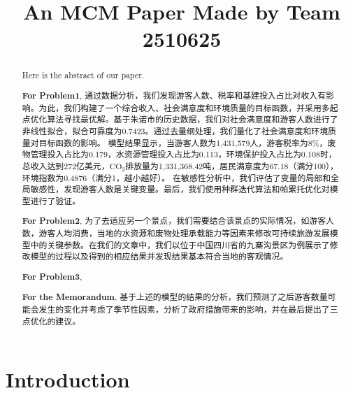 \documentclass[12pt]{article}  %
\title{An MCM Paper Made by Team 2510625}  %
\begin{document}
\begin{abstract}
    Here is the abstract of our paper.

    \textbf{For Problem1}, 通过数据分析，我们发现游客人数、税率和基建投入占比对收入有影响。为此，我们构建了一个综合收入、社会满意度和环境质量的目标函数，并采用多起点优化算法寻找最优解。基于朱诺市的历史数据，我们对社会满意度和游客人数进行了非线性拟合，拟合可靠度为0.7423。通过去量纲处理，我们量化了社会满意度和环境质量对目标函数的影响。
	模型结果显示，当游客人数为1,431,579人，游客税率为8\%，废物管理投入占比为0.179，水资源管理投入占比为0.113，环境保护投入占比为0.108时，总收入达到272亿美元，$\text{CO}_2$排放量为1,331,368.42吨，居民满意度为67.18（满分100），环境指数为0.4876（满分1，越小越好）。
	在敏感性分析中，我们评估了变量的局部和全局敏感性，发现游客人数是关键变量。最后，我们使用种群迭代算法和帕累托优化对模型进行了验证。

    \textbf{For Problem2}, 为了去适应另一个景点，我们需要结合该景点的实际情况，如游客人数，游客人均消费，当地的水资源和废物处理承载能力等因素来修改可持续旅游发展模型中的关键参数。在我们的文章中，我们以位于中国四川省的九寨沟景区为例展示了修改模型的过程以及得到的相应结果并发现结果基本符合当地的客观情况。

    \textbf{For Problem3}, 

	\textbf{For the Memorandum}, 基于上述的模型的结果的分析，我们预测了之后游客数量可能会发生的变化并考虑了季节性因素，分析了政府措施带来的影响，并在最后提出了三点优化的建议。

\end{abstract}

\maketitle  %
\tableofcontents  %


\section{Introduction}
\end{document}
